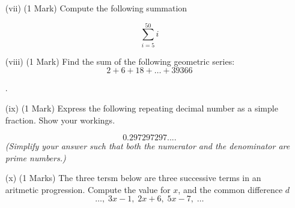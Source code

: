 \documentclass[11pt]{article} %
\begin{document}
\begin{enumerate} %
	\item[(vii)](1 Mark) Compute the following summation
	
	\[ \sum_{i=5}^{50} i \]

	\vspace{5.5cm}
	\item[(viii)] (1 Mark) Find the sum of the following geometric series: 
		\[2 + 6 + 18 +  \ldots + 39366		\]



\newpage
.
\newpage	
	\item[(ix)] (1 Mark) Express the following repeating decimal number as a simple fraction. Show your workings.
	
	\[0.297297297....\]
\textit{(Simplify your answer such that both the numerator and the denominator are prime numbers.)}
	\vspace{5.5cm}

	\item[(x)] (1 Marks) The three tersm below are three successive terms in an aritmetic progression. Compute the value for $x$, and the common difference $d$
		\[ \ldots,\; 3x-1,\; 2x+6,\;	5x-7,\; \ldots		  \]
		
\end{enumerate}
\end{document}
